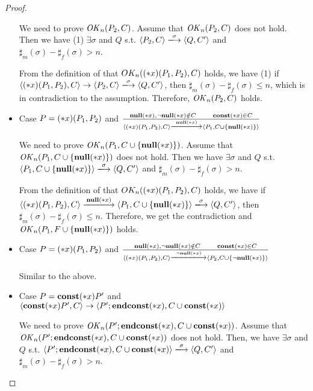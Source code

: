 \begin{proof}
\begin{itemize}
  We need to prove \(\mathit{OK}_n(P_2, C)\).  Assume that \(\mathit{OK}_n(P_2, C)\)
  does not hold. Then we have (1) \( \exists \sigma \) and \(Q\)
  s.t. \( \langle P_2, C \rangle \xlongrightarrow{\sigma} \langle Q,
  C' \rangle \) and \(\sharp_{m}(\sigma) - \sharp_{f}(\sigma) > n\).

  From the definition of that \(OK_n((*x)(P_1, P_2), C)\) holds, we
  have (1) if \( \langle \Sirx(P_1, P_2), C \rangle \rightarrow
  \langle P_2, C \rangle \xlongrightarrow{\sigma} \langle Q, C'
  \rangle \), then \(\sharp_m(\sigma) -
  \sharp_f(\sigma) \le n \), which is in
  contradiction to the assumption.  Therefore, \(\mathit{OK}_n(P_2, C)\)
  holds.

 \item Case \( P = (*x)(P_1,P_2) \) and \( \frac{ \snull,\snnull \notin C
  \andalso \scon\Sirx \in C} { \langle \Sirx(P_1, P_2), C \rangle
  \xlongrightarrow{\snull} \langle P_1, C\cup\{\snull\} \rangle } \)

  We need to prove \(\mathit{OK}_n(P_1, C\cup\{{\bf null}(*x)\})\).  Assume that
  \(\mathit{OK}_n(P_1, C\cup\{{\bf null}(*x)\})\) does not hold. Then we have \(
  \exists \sigma \) and \(Q\) s.t. \( \langle P_1, C\cup\{\snull\}
  \rangle \xlongrightarrow{\sigma} \langle Q, C' \rangle \) and
  \(\sharp_{m}(\sigma) - \sharp_{f}(\sigma) > n\).

  From the definition of that \(OK_n((*x)(P_1, P_2), C)\) holds, we
  have if \( \langle \Sirx(P_1, P_2), C \rangle \xlongrightarrow{\snull}
  \langle P_1, C\cup\{\snull\} \rangle \xlongrightarrow{\sigma}
  \langle Q, C' \rangle \), then \(\sharp_m(\sigma) - \sharp_f(\sigma)
  \le n \). Therefore, we
  get the contradiction and \(\mathit{OK}_n(P_1, F\cup\{{\bf null}(*x)\})\) holds.

\item Case \( P = (*x)(P_1,P_2) \) and \( \frac{ \snull,\snnull \notin C
  \andalso \scon\Sirx \in C} { \langle \Sirx(P_1, P_2), C \rangle
  \xlongrightarrow{\snnull} \langle P_2, C\cup\{\snnull\} \rangle } \)

  Similar to the above.
  
\item Case \( P = \mathbf{const}(*x) P' \) and \( \langle \mathbf{const}(*x) P', C \rangle
  \rightarrow \langle P';\mathbf{endconst}(*x), C\cup{\mathbf{const}(*x)} \rangle  \)

  We need to prove \(\mathit{OK}_n(P';\mathbf{endconst}(*x), C\cup{\mathbf{const}(*x)})\).  Assume
  that \(\mathit{OK}_n(P';\mathbf{endconst}(*x), C\cup{\mathbf{const}(*x)})\) does not hold. Then,
  we have \( \exists \sigma \) and \(Q\) s.t. \( \langle
  P';\Endconst, C\cup{\scon\Sirx} \rangle \xlongrightarrow{\sigma}
  \langle Q, C' \rangle \) and \(\sharp_{m}(\sigma) -
  \sharp_{f}(\sigma) > n\).


\end{itemize}
\end{proof}
